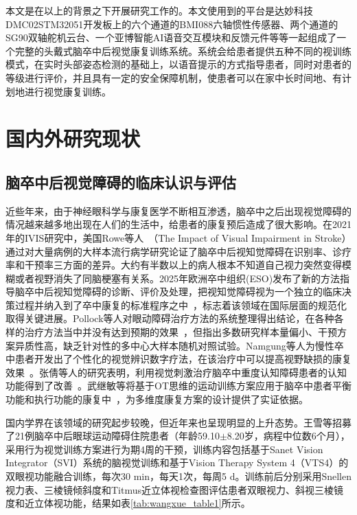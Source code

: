 本文是在以上的背景之下开展研究工作的。本文使用到的平台是达妙科技DMC02STM32051开发板上的六个通道的BMI088六轴惯性传感器、两个通道的SG90双轴舵机云台、一个亚博智能AI语音交互模块和反馈元件等等一起组成了一个完整的头戴式脑卒中后视觉康复训练系统。系统会给患者提供五种不同的视训练模式，在实时头部姿态检测的基础上，以语音提示的方式指导患者，同时对患者的等级进行评价，并且具有一定的安全保障机制，使患者可以在家中长时间地、有计划地进行视觉康复训练。

\section{国内外研究现状}

\subsection{脑卒中后视觉障碍的临床认识与评估}

近些年来，由于神经眼科学与康复医学不断相互渗透，脑卒中之后出现视觉障碍的情况越来越多地出现在人们的生活中，给患者的康复预后造成了很大影响。在2021年的IVIS研究中，美国Rowe等人~\cite{rowe2021ivis}（The Impact of Visual Impairment in Stroke）通过对大量病例的大样本流行病学研究论证了脑卒中后视知觉障碍在识别率、诊疗率和干预率三方面的差异。大约有半数以上的病人根本不知道自己视力突然变得模糊或者视野消失了同脑梗塞有关系。2025年欧洲卒中组织(ESO)发布了新的方法指导脑卒中后视知觉障碍的诊断、评价及处理，把视知觉障碍视为一个独立的临床决策过程并纳入到了卒中康复的标准程序之中~\cite{rowe2025eso}，标志着该领域在国际层面的规范化取得关键进展。Pollock等人对眼动障碍治疗方法的系统整理得出结论，在各种各样的治疗方法当中并没有达到预期的效果~\cite{pollock2011interventions}，但指出多数研究样本量偏小、干预方案异质性高，缺乏针对性的多中心大样本随机对照试验。Namgung等人为慢性卒中患者开发出了个性化的视觉辨识数字疗法，在该治疗中可以提高视野缺损的康复效果~\cite{namgung2024customized}。张倩等人的研究表明，利用视觉刺激治疗脑卒中重度认知障碍患者的认知功能得到了改善~\cite{zhang2024visual}。武继敏等将基于OT思维的运动训练方案应用于脑卒中患者平衡功能和执行功能的康复中~\cite{sun2024cognitive}，为多维度康复方案的设计提供了实证依据。

国内学界在该领域的研究起步较晚，但近年来也呈现明显的上升态势。王雪等招募了21例脑卒中后眼球运动障碍住院患者（年龄59.10$\pm$8.20岁，病程中位数6个月），采用行为视觉训练方案进行为期4周的干预，训练内容包括基于Sanet Vision Integrator（SVI）系统的脑视觉训练和基于Vision Therapy System 4（VTS4）的双眼视功能融合训练，每次30 min，每天1次，每周5 d。训练前后分别采用Snellen视力表、三棱镜倾斜度和Titmus近立体视检查图评估患者双眼视力、斜视三棱镜度和近立体视功能，结果如表\ref{tab:wangxue_table1}所示\cite{sun2024pursuit}。

